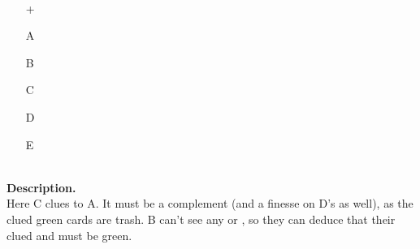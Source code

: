 \begin{example}	\hfill \\
	\begin{minipage}{0.45\textwidth}
		\begin{itemize}
			\item[\Large +]      
			\item[\Large A]    
			\item[\Large B]    
			\item[\Large C]    
			\item[\Large D]    
			\item[\Large E]    
		\end{itemize}
	\end{minipage}%
	\begin{minipage}{0.55\textwidth}
		\hfill \\
		
		\textbf{Description.} \\
		
		Here C clues  to A. It must be a complement (and a finesse on D's  as well), as the clued green cards are trash. B can't see any  or , so they can deduce that their clued  and  must be green.
	\end{minipage}
\end{example} \vspace{0.15 cm}

